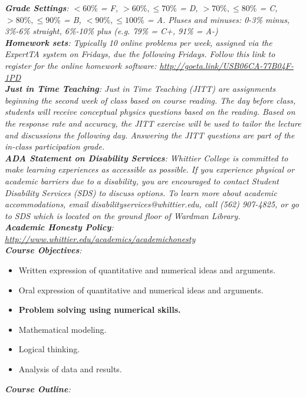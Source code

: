 \documentclass[10pt]{article}
\begin{document}
\textit{\textbf{Grade Settings}: $<60\%$ = F, $>60\%,\leq 70\%$ = D, $>70\%,\leq80\%$ = C, $>80\%,\leq 90\%$ = B, $<90\%,\leq 100\%$ = A.  Pluses and minuses: 0-3\% minus, 3\%-6\% straight, 6\%-10\% plus (e.g. 79\% = C+, 91\% = A-)} \\
\textit{\textbf{Homework sets}: Typically 10 online problems per week, assigned via the ExpertTA system on Fridays, due the following Fridays.  Follow this link to register for the online homework software: \url{http://goeta.link/USB06CA-77B04F-1PD}} \\
\textit{\textbf{Just in Time Teaching}: Just in Time Teaching (JITT) are assignments beginning the second week of class based on course reading.  The day before class, students will receive conceptual physics questions based on the reading.  Based on the response rate and accuracy, the JITT exercise will be used to tailor the lecture and discussions the following day.  Answering the JITT questions are part of the in-class participation grade.} \\
\textit{\textbf{ADA Statement on Disability Services}: Whittier College is committed to make learning experiences as accessible as possible. If you experience physical or academic barriers due to a disability, you are encouraged to contact Student Disability Services (SDS) to discuss options. To learn more about academic accommodations, email disabilityservices@whittier.edu, call (562) 907-4825, or go to SDS which is located on the ground floor of Wardman Library.} \\
\textit{\textbf{Academic Honesty Policy}: \url{http://www.whittier.edu/academics/academichonesty}} \\
\textit{\textbf{Course Objectives}:}
\begin{itemize}
\item Written expression of quantitative and numerical ideas and arguments.
\item Oral expression of quantitative and numerical ideas and arguments.
\item \textbf{Problem solving using numerical skills.}
\item Mathematical modeling.
\item Logical thinking.
\item Analysis of data and results.
\end{itemize}
\textit{\textbf{Course Outline}:}
\end{document}
